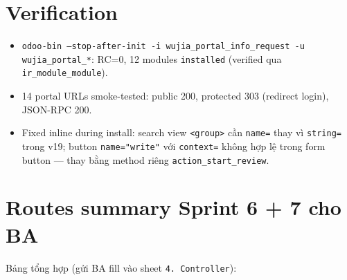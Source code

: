 \section{Verification}

\begin{itemize}[leftmargin=*]
    \item \texttt{odoo-bin --stop-after-init -i wujia\_portal\_info\_request -u wujia\_portal\_*}: RC=0, 12 modules \texttt{installed} (verified qua \texttt{ir\_module\_module}).
    \item 14 portal URLs smoke-tested: public 200, protected 303 (redirect login), JSON-RPC 200.
    \item Fixed inline during install: search view \texttt{<group>} cần \texttt{name=} thay vì \texttt{string=} trong v19; button \texttt{name="write"} với \texttt{context=} không hợp lệ trong form button --- thay bằng method riêng \texttt{action\_start\_review}.
\end{itemize}

\section{Routes summary Sprint 6 + 7 cho BA}

Bảng tổng hợp (gửi BA fill vào sheet \texttt{4. Controller}):

